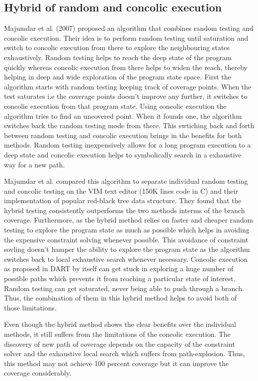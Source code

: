 \documentclass[	runningheads,
				a4paper]{llncs}
\begin{document}

\subsection{Hybrid of random and concolic execution}
Majumdar et al. (2007) \cite{majumdar2007hybrid} proposed an algorithm that combines random testing and concolic execution. Their idea is to perform random testing until saturation and switch to concolic execution from there to explore the neighbouring states exhaustively. Random testing helps to reach the deep state of the program quickly whereas concolic execution from there helps to widen the reach, thereby helping in deep and wide exploration of the program state space. First the algorithm starts with random testing keeping track of coverage points. When the test saturates i.e the coverage points doesn't improve any further, it switches to concolic execution from that program state. Using concolic execution the algorithm tries to find an uncovered point. When it founds one, the algorithm switches back the random testing mode from there. This swtiching back and forth between random testing and concolic execution brings in the benefits for both methods. Random testing inexpensively allows for a long program execution to a deep state and concolic execution helps to symbolically search in a exhaustive way for a new path.

Majumdar et al. \cite{majumdar2007hybrid} compared this algorithm to separate individual random testing and concolic testing on the VIM text editor (150K lines code in C) and their implementation of popular red-black tree data structure. They found that the hybrid testing consistently outperforms the two methods interms of the branch coverage. Furthermore, as the hybrid method relies on faster and cheaper random testing to explore the program state as much as possible which helps in avoiding the expensive constraint solving whenever possible. This avoidance of constraint sovling doesn't hamper the ability to explore the program state as the algorithm switches back to local exhaustive search whenever necessary. Concolic execution as proposed in DART \cite{godefroid2005dart} by itself can get stuck in exploring a huge number of possible paths which prevents it from reaching a particular state of interest. Random testing can get saturated, never being able to push through a branch. Thus, the combination of them in this hybrid method helps to avoid both of those limitations. 

Even though the hybrid method shows the clear benefits over the individual methods, it still suffers from the limitations of the concolic execution. The discovery of new path of coverage depends on the capacity of the constraint solver and the exhaustive local search which suffers from path-explosion. Thus, this method may not achieve 100 percent coverage but it can improve the coverage considerably.
\end{document}
